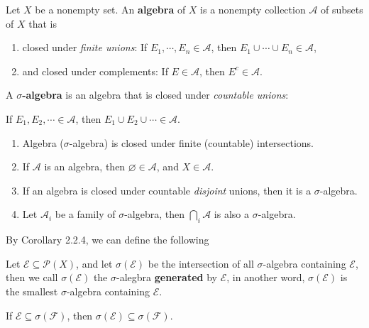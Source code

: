 \begin{definition}[Algebra]
 \normalfont Let $X$ be a nonempty set. An \textbf{algebra} of $X$ is a nonempty collection $\mathcal{A}$ of subsets of $X$ that is
 \begin{enumerate}
    \item closed under \textit{finite unions}: If $E_1,\cdots ,E_n \in \mathcal{A}$, then $E_1 \cup \cdots \cup E_n \in \mathcal{A}$,
    \item and closed under complements: If $E \in \mathcal{A}$, then $E^{c} \in \mathcal{A}$.
 \end{enumerate}
\end{definition}

\begin{definition}
 \normalfont A \textbf{$\sigma$-algebra} is an algebra that is closed under \textit{countable unions}: 
 
 If $E_1,E_2,\cdots \in \mathcal{A}$, then $E_1 \cup E_2 \cup \cdots \in \mathcal{A}$.
\end{definition}

\begin{corollary}
 \normalfont 
 \begin{enumerate}
    \item Algebra ($\sigma$-algebra) is closed under finite (countable) intersections.
    \item If $\mathcal{A}$ is an algebra, then $\varnothing \in \mathcal{A}$, and $X \in \mathcal{A}$.
    \item If an algebra is closed under countable \textit{disjoint} unions, then it is a $\sigma$-algebra.
    \item Let ${\mathcal{A}_i}$ be a family of $\sigma$-algebra, then $\bigcap_{i} \mathcal{A} $ is also a $\sigma$-algebra.
 \end{enumerate}
\end{corollary}

By Corollary 2.2.4, we can define the following
\begin{definition}
 \normalfont Let $\mathcal{E} \subseteq \mathcal{P}(X)$, and let $\sigma(\mathcal{E})$ be the intersection of all $\sigma$-algebra containing $\mathcal{E}$, then we call $\sigma(\mathcal{E})$ the $\sigma$-alegbra \textbf{generated} by $\mathcal{E}$, in another word, $\sigma(\mathcal{E})$ is the smallest $\sigma$-algebra containing $\mathcal{E}$.
\end{definition}

\begin{lemma} \label{Lemma 2.1}
\normalfont If $\mathcal{E} \subseteq \sigma(\mathcal{F})$, then $\sigma(\mathcal{E}) \subseteq \sigma(\mathcal{F})$.
\end{lemma}


